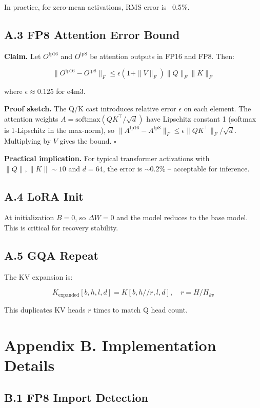In practice, for zero-mean activations, RMS error is ~0.5\%.

\subsection{A.3 FP8 Attention Error Bound}

\textbf{Claim.} Let $O^\text{fp16}$ and $O^\text{fp8}$ be attention outputs in 
FP16 and FP8. Then:

\[
\|O^\text{fp16} - O^\text{fp8}\|_F \leq \epsilon (1 + \|V\|_F) \|Q\|_F \|K\|_F
\tag{A.4}
\]

where $\epsilon \approx 0.125$ for e4m3.

\textbf{Proof sketch.} The Q/K cast introduces relative error $\epsilon$ on each 
element. The attention weights $A = \text{softmax}(QK^\top/\sqrt{d})$ have 
Lipschitz constant 1 (softmax is 1-Lipschitz in the max-norm), so 
$\|A^\text{fp16} - A^\text{fp8}\|_F \leq \epsilon \|QK^\top\|_F / \sqrt{d}$. 
Multiplying by $V$ gives the bound. $\square$

\textbf{Practical implication.} For typical transformer activations with 
$\|Q\|, \|K\| \sim 10$ and $d = 64$, the error is $\sim 0.2\%$ -- acceptable 
for inference.

\subsection{A.4 LoRA Init}

At initialization $B = 0$, so $\Delta W = 0$ and the model reduces to the 
base model. This is critical for recovery stability.

\subsection{A.5 GQA Repeat}

The KV expansion is:

\[
K_\text{expanded}[b, h, l, d] = K[b, h // r, l, d], \quad r = H / H_{kv}
\tag{A.5}
\]

This duplicates KV heads $r$ times to match Q head count.




\section{Appendix B. Implementation Details}

\subsection{B.1 FP8 Import Detection}

